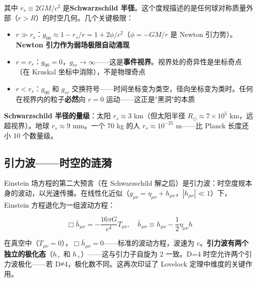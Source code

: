 其中 $r_s \equiv 2GM/c^2$ 是\textbf{Schwarzschild 半径}。这个度规描述的是任何球对称质量外部（$r > R$）的时空几何。几个关键极限：

\begin{itemize}
\item \textbf{$r \gg r_s$}：$g_{00} \approx 1 - r_s/r = 1 + 2\phi/c^2$（$\phi = -GM/r$ 是 Newton 引力势）。\textbf{Newton 引力作为弱场极限自动涌现}
\item \textbf{$r = r_s$}：$g_{00} = 0$，$g_{rr} \to \infty$——这是\textbf{事件视界}。视界处的奇异性是坐标奇点（在 Kruskal 坐标中消除），不是物理奇点
\item \textbf{$r < r_s$}：$g_{00}$ 和 $g_{rr}$ 交换符号——时间坐标变为类空，径向坐标变为类时。任何在视界内的粒子\textbf{必然}向 $r=0$ 运动——这正是"黑洞"的本质
\end{itemize}

\textbf{Schwarzschild 半径的量级}：太阳 $r_s \approx 3$ km（但太阳半径 $R_\odot \approx 7\times10^5$ km，远超视界）。地球 $r_s \approx 9$ mm。一个 70 kg 的人 $r_s \approx 10^{-25}$ m——比 Planck 长度还小 10 个数量级。

\subsection{引力波——时空的涟漪}

Einstein 场方程的第二大预言（在 Schwarzschild 解之后）是引力波：时空度规本身的波动，以光速传播。在线性化近似（$g_{\mu\nu} = \eta_{\mu\nu} + h_{\mu\nu}$，$|h_{\mu\nu}| \ll 1$）下，Einstein 方程退化为一组波动方程：

\begin{equation}
\Box \bar{h}_{\mu\nu} = -\frac{16\pi G}{c^4}T_{\mu\nu}, \quad \bar{h}_{\mu\nu} \equiv h_{\mu\nu} - \frac{1}{2}\eta_{\mu\nu}h
\end{equation}

在真空中（$T_{\mu\nu}=0$），$\Box \bar{h}_{\mu\nu} = 0$——标准的波动方程，波速为 $c$。\textbf{引力波有两个独立的极化态}（$h_+$ 和 $h_\times$）——这与引力子自旋为 2 一致。D=4 时空允许两个引力波极化——若 D≠4，极化数不同。这再次印证了 Lovelock 定理中维度的关键作用。

